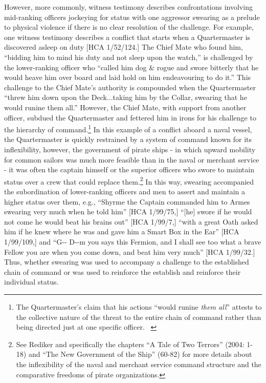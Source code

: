 \begin{styleStandard}
However, more commonly, witness testimony describes confrontations involving mid-ranking officers jockeying for status with one aggressor swearing as a prelude to physical violence if there is no clear resolution of the challenge. For example, one witness testimony describes a conflict that starts when a Quartermaster is discovered asleep on duty [HCA 1/52/124.] The Chief Mate who found him, “bidding him to mind his duty and not sleep upon the watch,” is challenged by the lower-ranking officer who “called him dog \& rogue and swore bitterly that he would heave him over board and laid hold on him endeavouring to do it.” This challenge to the Chief Mate’s authority is compounded when the Quartermaster “threw him down upon the Deck...taking him by the Collar, swearing that he would runine them all.” However, the Chief Mate, with support from another officer, subdued the Quartermaster and fettered him in irons for his challenge to the hierarchy of command.\footnote{ The Quartermaster’s claim that his actions “would runine \textit{them all}” attests to the collective nature of the threat to the entire chain of command rather than being directed just at one specific officer. \ } In this example of a conflict aboard a naval vessel, the Quartermaster is quickly restrained by a system of command known for its inflexibility, however, the government of pirate ships - in which upward mobility for common sailors was much more feasible than in the naval or merchant service - it was often the captain himself or the superior officers who swore to maintain status over a crew that could replace them.\footnote{ See Rediker and specifically the chapters “A Tale of Two Terrors” (2004: 1-18) and “The New Government of the Ship” (60-82) for more details about the inflexibility of the naval and merchant service command structure and the comparative freedoms of pirate organizations. \par } In this way, swearing accompanied the subordination of lower-ranking officers and men to assert and maintain a higher status over them, e.g., “Shyrme the Captain commanded him to Armes swearing very much when he told him” [HCA 1/99/75,] “[he] swore if he would not come he would beat his brains out” [HCA 1/99/7,] “with a great Oath asked him if he knew where he was and gave him a Smart Box in the Ear” [HCA 1/99/109,] and “G-{}- D-{}-m you says this Fermion, and I shall see too what a brave Fellow you are when you come down, and beat him very much” [HCA 1/99/32.] Thus, whether swearing was used to accompany a challenge to the established chain of command or was used to reinforce the  establish and reinforce their individual status.
\end{styleStandard}


